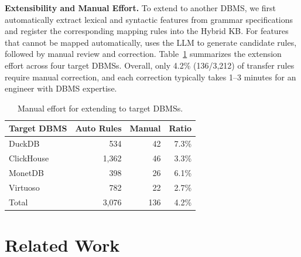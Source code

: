 \documentclass[conference]{IEEEtran}
\begin{document}
\textbf{Extensibility and Manual Effort.}
To extend \tool{} to another DBMS, we first automatically extract lexical and syntactic features from grammar specifications and register the corresponding mapping rules into the Hybrid KB.
For features that cannot be mapped automatically, \tool{} uses the LLM to generate candidate rules, followed by manual review and correction.
Table~\ref{tab:manual_effort} summarizes the extension effort across four target DBMSs.
Overall, only 4.2\% (136/3,212) of transfer rules require manual correction, and each correction typically takes 1--3 minutes for an engineer with DBMS expertise.

\begin{table}[t]
\centering
\footnotesize
\caption{Manual effort for extending \tool{} to target DBMSs.}
\label{tab:manual_effort}
\setlength{\tabcolsep}{3pt}
\begin{tabular*}{\columnwidth}{@{\extracolsep{\fill}}lrrr@{}}
\toprule
\textbf{Target DBMS} & \textbf{Auto Rules} & \textbf{Manual} & \textbf{Ratio} \\
\midrule
DuckDB & 534 & 42 & 7.3\% \\
ClickHouse & 1,362 & 46 & 3.3\% \\
MonetDB & 398 & 26 & 6.1\% \\
Virtuoso & 782 & 22 & 2.7\% \\
\midrule
Total & 3,076 & 136 & 4.2\% \\
\bottomrule
\end{tabular*}
\end{table}



\section{Related Work}
\label{sec:related_work}
\end{document}
